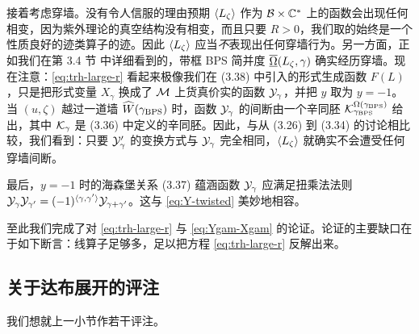 接着考虑穿墙。没有令人信服的理由预期 $\langle L_\zeta \rangle$ 作为 $\mathcal{B}\times\mathbb{C}^*$ 上的函数会出现任何相变，因为紫外理论的真空结构没有相变，而且只要 $R>0$，我们取的始终是一个性质良好的迹类算子的迹。因此 $\langle L_\zeta \rangle$ 应当\emph{不}表现出任何穿墙行为。另一方面，正如我们在第 3.4 节%
中详细看到的，带框 BPS 简并度 $\overline{\underline{\Omega}}(L_\zeta,\gamma)$ 确实经历穿墙。现在注意：\eqref{eq:trh-large-r}
看起来极像我们在 (3.38)%
中引入的形式生成函数 $F(L)$，只是把形式变量 $X_\gamma$ 换成了 $\mathcal{M}$ 上货真价实的函数 $\mathcal{Y}_\gamma$，并把 $y$ 取为 $y=-1$。当 $(u,\zeta)$ 越过一道墙 $\widehat{W}(\gamma_{\rm BPS})$ 时，函数 $\mathcal{Y}_\gamma$ 的间断由一个辛同胚 $\mathcal{K}_{\gamma_{\rm BPS}}^{\Omega(\gamma_{\rm BPS})}$ 给出，其中 $\mathcal{K}_{\gamma}$ 是 (3.36)%
中定义的辛同胚。因此，与从 (3.26)%
到 (3.34)%
的讨论相比较，我们看到：只要 $\mathcal{Y}'_\gamma$ 的变换方式与 $\mathcal{Y}_\gamma$ 完全相同，$\langle L_\zeta \rangle$ 就确实不会遭受任何穿墙间断。

最后，$y=-1$ 时的海森堡关系 (3.37)%
蕴涵函数 $\mathcal{Y}_\gamma$ 应满足扭乘法法则 $\mathcal{Y}_\gamma \mathcal{Y}_{\gamma'} =(-1)^{\langle \gamma,\gamma'\rangle} \mathcal{Y}_{\gamma+\gamma'}$。这与 \eqref{eq:Y-twisted}
美妙地相容。

至此我们完成了对 \eqref{eq:trh-large-r}
与 \eqref{eq:Ygam-Xgam}
的论证。论证的主要缺口在于如下断言：线算子足够多，足以把方程 \eqref{eq:trh-large-r}
反解出来。


\subsection{关于达布展开的评注}

我们想就上一小节作若干评注。

